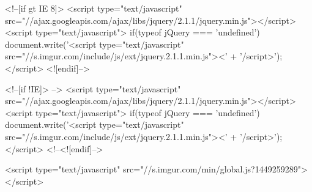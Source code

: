 <!--[if gt IE 8]>
<script type="text/javascript" src="//ajax.googleapis.com/ajax/libs/jquery/2.1.1/jquery.min.js"></script>
<script type="text/javascript">
if(typeof jQuery === 'undefined') {
    document.write('<script type="text/javascript" src="//s.imgur.com/include/js/ext/jquery.2.1.1.min.js"><' + '/script>');
}
</script>
<![endif]-->

<!--[if !IE]> -->
<script type="text/javascript" src="//ajax.googleapis.com/ajax/libs/jquery/2.1.1/jquery.min.js"></script>
<script type="text/javascript">
if(typeof jQuery === 'undefined') {
    document.write('<script type="text/javascript" src="//s.imgur.com/include/js/ext/jquery.2.1.1.min.js"><' + '/script>');
}
</script>
<!--<![endif]-->



        <script type="text/javascript" src="//s.imgur.com/min/global.js?1449259289"></script>

